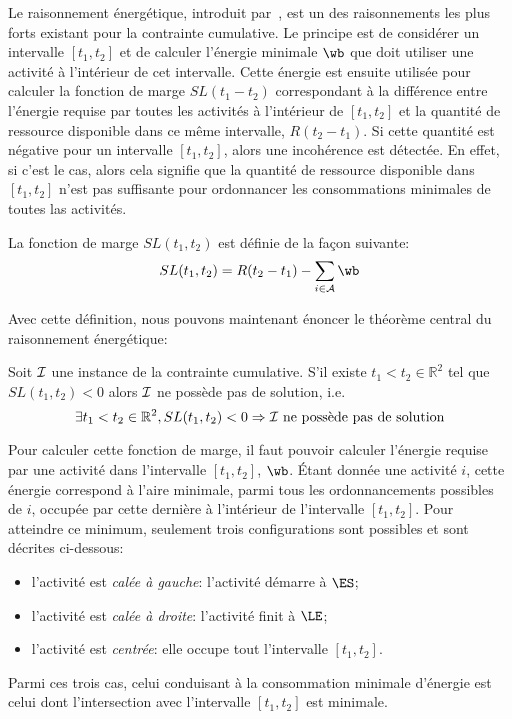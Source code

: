 Le raisonnement énergétique, introduit par~\cite{RELopez}, est un des
raisonnements les plus forts existant pour la contrainte
cumulative. Le principe est de considérer un intervalle $[t_1,t_2]$ et
de calculer l'énergie minimale $\wb$ que doit utiliser une activité à
l'intérieur de cet intervalle. Cette énergie est ensuite utilisée pour
calculer la fonction de marge $SL(t_1-t_2)$ correspondant à la
différence entre l'énergie requise par toutes les activités à
l'intérieur de $[t_1,t_2]$ et la quantité de ressource disponible dans
ce même intervalle, $R (t_2-t_1)$. Si cette quantité est négative pour
un intervalle $[t_1,t_2]$, alors une incohérence est détectée. En
effet, si c'est le cas, alors cela signifie que la quantité de
ressource disponible dans $[t_1,t_2]$ n'est pas suffisante pour
ordonnancer les consommations minimales de toutes las activités.

\begin{defi}
La fonction de marge $SL(t_1,t_2)$ est définie de la façon suivante: 
\[  SL(t_1,t_2) = R (t_2-t_1) - \sum_{i \in \A} \wb \]
\end{defi}

Avec cette définition, nous pouvons maintenant énoncer le théorème
central du raisonnement énergétique:
 
\begin{theo}
\label{th:centerRE}
Soit ${\cal I}$ une instance de la contrainte cumulative. S'il existe
$t_1 < t_2 \in \mathbb{R}^2$ tel que $SL(t_1,t_2) <0$ alors ${\cal I}$ ne
possède pas de solution, i.e.
\begin{equation}
\exists t_1 < t_2 \in \mathbb{R}^2 , SL(t_1,t_2) <0 \Rightarrow {\cal I}
\text{ ne possède pas de solution}
\label{eq:centerRE}
\end{equation}
\end{theo}

Pour calculer cette fonction de marge, il faut pouvoir calculer
l'énergie requise par une activité dans l'intervalle $[t_1,t_2]$,
$\wb$. {\'E}tant donnée une activité $i$, cette énergie correspond à
l'aire minimale, parmi tous les ordonnancements possibles de $i$,
occupée par cette dernière à l'intérieur de l'intervalle
$[t_1,t_2]$. Pour atteindre ce minimum, seulement trois configurations
sont possibles et sont décrites ci-dessous:
\begin{itemize}
\item l'activité est {\it calée à gauche}: l'activité démarre à $\ES$; 
\item l'activité est {\it  calée à droite}: l'activité finit à $\LE$;
\item l'activité est {\it centrée}: elle occupe tout l'intervalle
  $[t_1,t_2]$.
\end{itemize}
Parmi ces trois cas, celui conduisant à la consommation minimale
d'énergie est celui dont l'intersection avec l'intervalle $[t_1,t_2]$
est minimale. 

